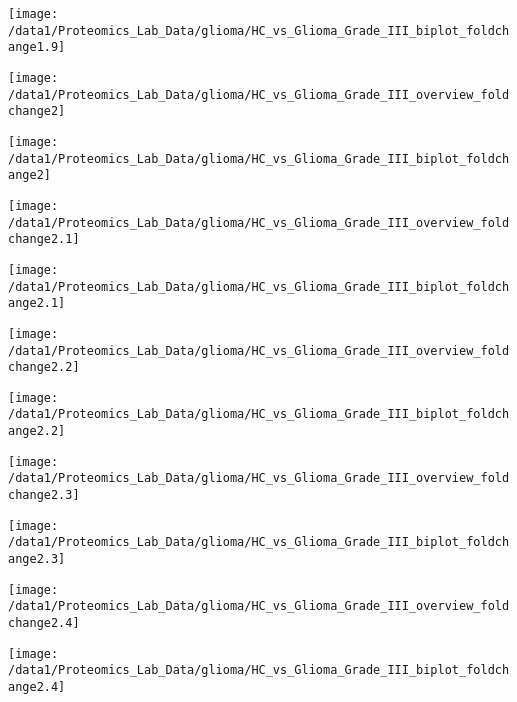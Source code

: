 \documentclass{article}
\begin{document}
\centerline{\texttt{[image: /data1/Proteomics\_Lab\_Data/glioma/HC\_vs\_Glioma\_Grade\_III\_biplot\_foldchange1.9]}}

\clearpage\centerline{\texttt{[image: /data1/Proteomics\_Lab\_Data/glioma/HC\_vs\_Glioma\_Grade\_III\_overview\_foldchange2]}}

\centerline{\texttt{[image: /data1/Proteomics\_Lab\_Data/glioma/HC\_vs\_Glioma\_Grade\_III\_biplot\_foldchange2]}}

\clearpage\centerline{\texttt{[image: /data1/Proteomics\_Lab\_Data/glioma/HC\_vs\_Glioma\_Grade\_III\_overview\_foldchange2.1]}}

\centerline{\texttt{[image: /data1/Proteomics\_Lab\_Data/glioma/HC\_vs\_Glioma\_Grade\_III\_biplot\_foldchange2.1]}}

\clearpage\centerline{\texttt{[image: /data1/Proteomics\_Lab\_Data/glioma/HC\_vs\_Glioma\_Grade\_III\_overview\_foldchange2.2]}}

\centerline{\texttt{[image: /data1/Proteomics\_Lab\_Data/glioma/HC\_vs\_Glioma\_Grade\_III\_biplot\_foldchange2.2]}}

\clearpage\centerline{\texttt{[image: /data1/Proteomics\_Lab\_Data/glioma/HC\_vs\_Glioma\_Grade\_III\_overview\_foldchange2.3]}}

\centerline{\texttt{[image: /data1/Proteomics\_Lab\_Data/glioma/HC\_vs\_Glioma\_Grade\_III\_biplot\_foldchange2.3]}}

\clearpage\centerline{\texttt{[image: /data1/Proteomics\_Lab\_Data/glioma/HC\_vs\_Glioma\_Grade\_III\_overview\_foldchange2.4]}}

\centerline{\texttt{[image: /data1/Proteomics\_Lab\_Data/glioma/HC\_vs\_Glioma\_Grade\_III\_biplot\_foldchange2.4]}}

\clearpage
\end{document}
